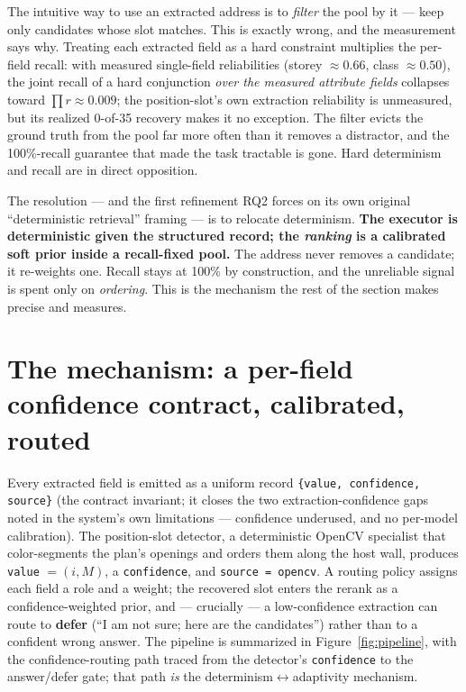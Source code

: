 The intuitive way to use an extracted address is to \emph{filter} the pool by it --- keep only
candidates whose slot matches. This is exactly wrong, and the measurement says why. Treating each
extracted field as a hard constraint multiplies the per-field recall: with measured single-field
reliabilities (storey $\approx 0.66$, class $\approx 0.50$), the joint recall of a hard conjunction
\emph{over the measured attribute fields} collapses toward $\prod r \approx 0.009$; the
position-slot's own extraction reliability is unmeasured, but its realized 0-of-35 recovery makes it
no exception. The filter evicts the ground truth from the pool far more often than it removes a
distractor, and the 100\%-recall guarantee that made the task tractable is gone. Hard determinism and
recall are in direct opposition.

The resolution --- and the first refinement RQ2 forces on its own original ``deterministic
retrieval'' framing --- is to relocate determinism. \textbf{The executor is deterministic given the
structured record; the \emph{ranking} is a calibrated soft prior inside a recall-fixed pool.} The
address never removes a candidate; it re-weights one. Recall stays at 100\% by construction, and the
unreliable signal is spent only on \emph{ordering}. This is the mechanism the rest of the section
makes precise and measures.

\section{The mechanism: a per-field confidence contract, calibrated, routed}

Every extracted field is emitted as a uniform record \texttt{\{value, confidence, source\}} (the
contract invariant; it closes the two extraction-confidence gaps noted in the system's own
limitations --- confidence underused, and no per-model calibration). The position-slot detector, a
deterministic OpenCV specialist that color-segments the plan's openings and orders them along the
host wall, produces \texttt{value} $= (i, M)$, a \texttt{confidence}, and \texttt{source = opencv}. A
routing policy assigns each field a role and a weight; the recovered slot enters the rerank as a
confidence-weighted prior, and --- crucially --- a low-confidence extraction can route to
\textbf{defer} (``I am not sure; here are the candidates'') rather than to a confident wrong answer.
The pipeline is summarized in Figure~\ref{fig:pipeline}, with the confidence-routing path traced from
the detector's \texttt{confidence} to the answer/defer gate; that path \emph{is} the
determinism$\leftrightarrow$adaptivity mechanism.


